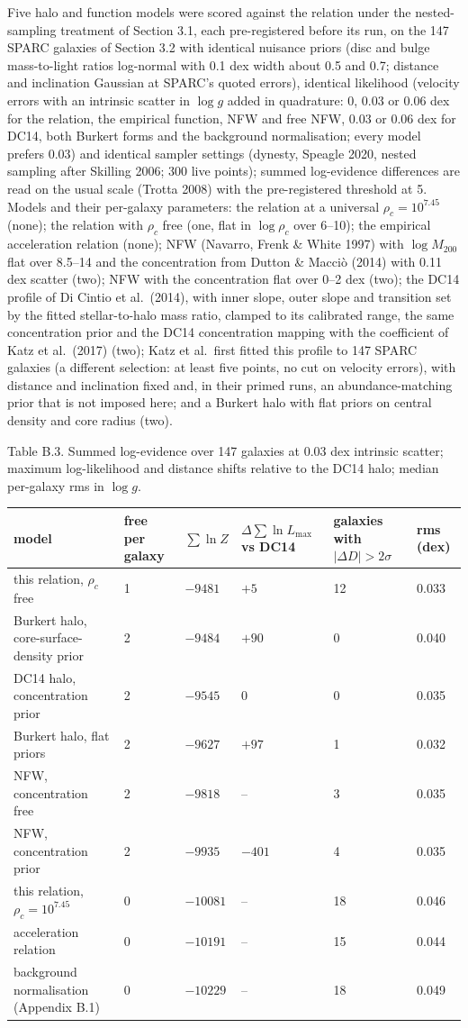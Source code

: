 \documentclass[
  10pt,
]{article}
\begin{document}
Five halo and function models were scored against the relation under the nested-sampling treatment of Section 3.1, each pre-registered before its run, on the 147 SPARC galaxies of Section 3.2 with identical nuisance priors (disc and bulge mass-to-light ratios log-normal with 0.1 dex width about 0.5 and 0.7; distance and inclination Gaussian at SPARC's quoted errors), identical likelihood (velocity errors with an intrinsic scatter in $\log g$ added in quadrature: 0, 0.03 or 0.06 dex for the relation, the empirical function, NFW and free NFW, 0.03 or 0.06 dex for DC14, both Burkert forms and the background normalisation; every model prefers 0.03) and identical sampler settings (dynesty, Speagle 2020, nested sampling after Skilling 2006; 300 live points); summed log-evidence differences are read on the usual scale (Trotta 2008) with the pre-registered threshold at 5. Models and their per-galaxy parameters: the relation at a universal $\rho_c=10^{7.45}$ (none); the relation with $\rho_c$ free (one, flat in $\log\rho_c$ over 6--10); the empirical acceleration relation (none); NFW (Navarro, Frenk \& White 1997) with $\log M_{200}$ flat over 8.5--14 and the concentration from Dutton \& Macci\`o (2014) with 0.11 dex scatter (two); NFW with the concentration flat over 0--2 dex (two); the DC14 profile of Di Cintio et al.~(2014), with inner slope, outer slope and transition set by the fitted stellar-to-halo mass ratio, clamped to its calibrated range, the same concentration prior and the DC14 concentration mapping with the coefficient of Katz et al.~(2017) (two); Katz et al.\ first fitted this profile to 147 SPARC galaxies (a different selection: at least five points, no cut on velocity errors), with distance and inclination fixed and, in their primed runs, an abundance-matching prior that is not imposed here; and a Burkert halo with flat priors on central density and core radius (two).

Table B.3. Summed log-evidence over 147 galaxies at 0.03 dex intrinsic scatter; maximum log-likelihood and distance shifts relative to the DC14 halo; median per-galaxy rms in $\log g$.

\begin{longtable}[]{@{}p{4.9cm}p{1.6cm}p{1.6cm}p{2.1cm}p{2.0cm}p{1.6cm}@{}}
\toprule
model & free per galaxy & $\sum\ln Z$ & $\Delta\sum\ln L_{\max}$ vs DC14 & galaxies with $|\Delta D|>2\sigma$ & rms (dex)\tabularnewline
\midrule
\endhead
this relation, $\rho_c$ free & 1 & $-9481$ & $+5$ & 12 & 0.033\tabularnewline
Burkert halo, core-surface-density prior & 2 & $-9484$ & $+90$ & 0 & 0.040\tabularnewline
DC14 halo, concentration prior & 2 & $-9545$ & 0 & 0 & 0.035\tabularnewline
Burkert halo, flat priors & 2 & $-9627$ & $+97$ & 1 & 0.032\tabularnewline
NFW, concentration free & 2 & $-9818$ & -- & 3 & 0.035\tabularnewline
NFW, concentration prior & 2 & $-9935$ & $-401$ & 4 & 0.035\tabularnewline
this relation, $\rho_c=10^{7.45}$ & 0 & $-10081$ & -- & 18 & 0.046\tabularnewline
acceleration relation & 0 & $-10191$ & -- & 15 & 0.044\tabularnewline
background normalisation (Appendix B.1) & 0 & $-10229$ & -- & 18 & 0.049\tabularnewline
\bottomrule
\end{longtable}
\end{document}
